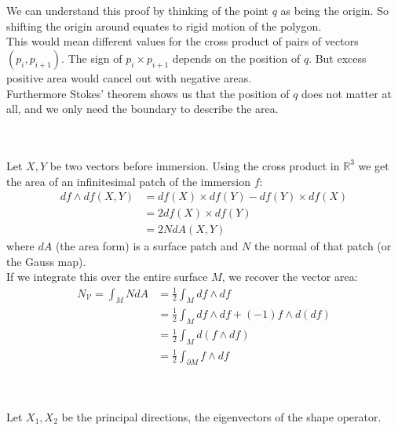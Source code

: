 \documentclass{article}
\newcommand\ifrac[2]{{\displaystyle\frac{#1}{#2}}}
\def\hal{\ifrac{1}{2}}
\def\R{\mathbb{R}}
\def\R{\mathbb{R}}
\begin{document}
\vspace{1.8cm}
\\\\


We can understand this proof by thinking of the point $q$ as being the origin. So shifting the origin around equates to 
rigid motion of the polygon.\\ This would mean different values 
for the cross product of pairs of vectors $(p_i, p_{i+1})$. The sign of $p_i \times p_{i+1}$ depends on the position of $q$.
But excess positive area would cancel out with negative areas.\\
Furthermore Stokes' theorem shows us that the position of $q$ does not matter at all, and we only need the boundary
to describe the area.


\vspace{1.8cm}
\\\\


Let $X, Y$ be two vectors before immersion. Using the cross product in $\R^3$ we get the area of an infinitesimal patch
of the immersion $f$:
\begin{align*}
    df \wedge df(X, Y) &= df(X) \times df(Y) - df(Y) \times df(X)\\
        &= 2df(X) \times df(Y)\\
        &= 2NdA(X, Y)
\end{align*}
where $dA$ (the area form) is a surface patch and $N$ the normal of that patch (or the Gauss map).\\
If we integrate this over the entire surface $M$, we recover the vector area:
\begin{align*}
    N_{\mathcal{V}} = \int_M NdA &=  \hal \int_M df \wedge df\\
        &= \hal \int_M df \wedge df + (-1) f \wedge d(df) \\
        &= \hal \int_M d(f \wedge df) \tag*{because $d(df) = 0$}\\
        &= \hal \int_{\partial M} f \wedge df \tag*{(using Stokes' thorem)}
\end{align*}


\vspace{1.8cm}
\\\\


Let $X_1, X_2$ be the principal directions, the eigenvectors of the shape operator.
\end{document}
